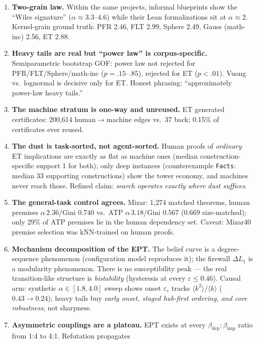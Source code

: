 \documentclass[11pt]{article}
\newcommand{\code}[1]{\texttt{#1}}
\begin{document}
\begin{enumerate}[leftmargin=1.4em, itemsep=2pt]
\item \textbf{Two-grain law.} Within the same projects, informal blueprints show the ``Wiles
  signature'' ($\alpha\approx3.3$--$4.6$) while their Lean formalizations sit at
  $\alpha\approx2$. Kernel-grain ground truth: PFR 2.46, FLT 2.99, Sphere 2.49, Gauss
  (math-inc) 2.56, ET 2.88.
\item \textbf{Heavy tails are real but ``power law'' is corpus-specific.} Semiparametric
  bootstrap GOF: power law not rejected for PFR/FLT/Sphere/math-inc ($p=.15$--$.85$),
  rejected for ET ($p<.01$). Vuong vs.\ lognormal is decisive only for ET. Honest phrasing:
  ``approximately power-law heavy tails.''
\item \textbf{The machine stratum is one-way and unreused.} ET generated certificates:
  200{,}614 human$\to$machine edges vs.\ 37 back; 0.15\% of certificates ever reused.
\item \textbf{The dust is task-sorted, not agent-sorted.} Human proofs of \emph{ordinary} ET
  implications are exactly as flat as machine ones (median construction-specific support 1
  for both); only deep instances (counterexample \code{Facts}: median 33 supporting
  constructions) show the tower economy, and machines never reach those. Refined claim:
  \emph{search operates exactly where dust suffices}.
\item \textbf{The general-task control agrees.} Mizar: 1{,}274 matched theorems, human
  premises $\alpha\,2.36$/Gini $0.740$ vs.\ ATP $\alpha\,3.18$/Gini $0.567$
  ($0.669$ size-matched); only 29\% of ATP premises lie in the human dependency set.
  Caveat: Mizar40 premise selection was kNN-trained on human proofs.
\item \textbf{Mechanism decomposition of the EPT.} The belief curve is a degree-sequence
  phenomenon (configuration model reproduces it); the firewall $\Delta L_1$ is a modularity
  phenomenon. There is no susceptibility peak --- the real transition-like structure is
  \emph{bistability} (hysteresis at every $\varepsilon\le0.46$). Causal arm: synthetic
  $\alpha\in[1.8,4.0]$ sweep shows onset $\varepsilon_c$ tracks
  $\langle k^2\rangle/\langle k\rangle$ ($0.43\to0.24$); heavy tails buy \emph{early onset,
  staged hub-first ordering, and core robustness}, not sharpness.
\item \textbf{Asymmetric couplings are a plateau.} EPT exists at every
  $\beta_{\mathrm{dep}}{:}\beta_{\mathrm{imp}}$ ratio from 1:4 to 4:1. Refutation propagates

\end{enumerate}
\end{document}
